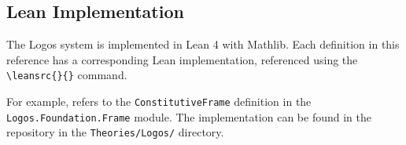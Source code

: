 \documentclass[../LogosReference.tex]{subfiles}
\begin{document}

\subsection{Lean Implementation}\label{sec:lean-implementation}

The Logos system is implemented in Lean 4 with Mathlib. Each definition in this reference has a corresponding Lean implementation, referenced using the \verb|\leansrc{}{}| command.

For example,  refers to the \texttt{ConstitutiveFrame} definition in the \texttt{Logos.Foundation.Frame} module.
The implementation can be found in the \proofchecker{} repository in the \texttt{Theories/Logos/} directory.
\end{document}
